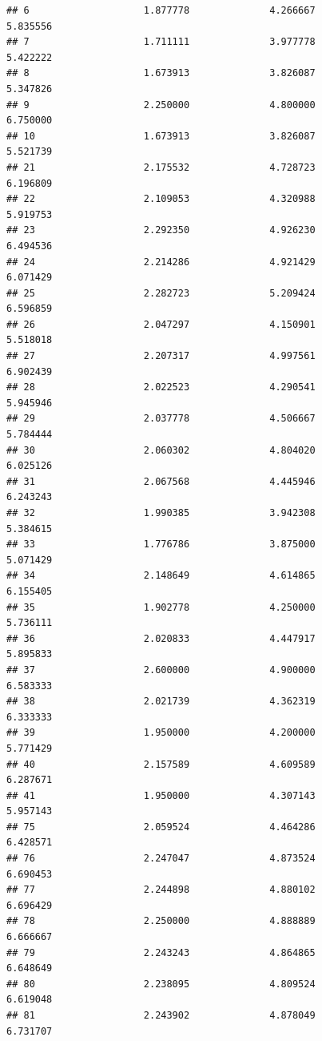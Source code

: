 \documentclass[]{article}
\begin{document}
\begin{verbatim}
## 6                    1.877778              4.266667                 5.835556
## 7                    1.711111              3.977778                 5.422222
## 8                    1.673913              3.826087                 5.347826
## 9                    2.250000              4.800000                 6.750000
## 10                   1.673913              3.826087                 5.521739
## 21                   2.175532              4.728723                 6.196809
## 22                   2.109053              4.320988                 5.919753
## 23                   2.292350              4.926230                 6.494536
## 24                   2.214286              4.921429                 6.071429
## 25                   2.282723              5.209424                 6.596859
## 26                   2.047297              4.150901                 5.518018
## 27                   2.207317              4.997561                 6.902439
## 28                   2.022523              4.290541                 5.945946
## 29                   2.037778              4.506667                 5.784444
## 30                   2.060302              4.804020                 6.025126
## 31                   2.067568              4.445946                 6.243243
## 32                   1.990385              3.942308                 5.384615
## 33                   1.776786              3.875000                 5.071429
## 34                   2.148649              4.614865                 6.155405
## 35                   1.902778              4.250000                 5.736111
## 36                   2.020833              4.447917                 5.895833
## 37                   2.600000              4.900000                 6.583333
## 38                   2.021739              4.362319                 6.333333
## 39                   1.950000              4.200000                 5.771429
## 40                   2.157589              4.609589                 6.287671
## 41                   1.950000              4.307143                 5.957143
## 75                   2.059524              4.464286                 6.428571
## 76                   2.247047              4.873524                 6.690453
## 77                   2.244898              4.880102                 6.696429
## 78                   2.250000              4.888889                 6.666667
## 79                   2.243243              4.864865                 6.648649
## 80                   2.238095              4.809524                 6.619048
## 81                   2.243902              4.878049                 6.731707

\end{verbatim}
\end{document}
